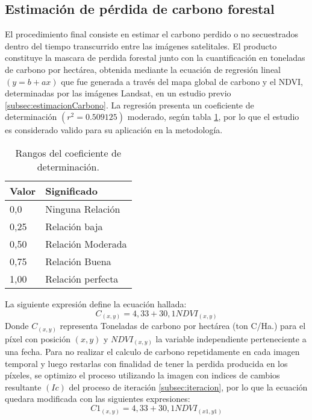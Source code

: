 \subsection{Estimaci\'on de p\'erdida de carbono forestal}
El procedimiento final consiste en estimar el carbono perdido o no secuestrados dentro del tiempo transcurrido entre las im\'agenes satelitales. El producto constituye la mascara de perdida forestal junto con la cuantificaci\'on en toneladas de carbono por hect\'area, obtenida mediante la ecuaci\'on de regresi\'on lineal $(y= b + ax) $ que fue generada a través del mapa global de carbono \cite{saatchi2011benchmark} y el NDVI, determinadas por las im\'agenes Landsat, en un estudio previo \ref{subsec:estimacionCarbono}. La regresi\'on presenta un coeficiente de determinaci\'on $ (r^{2}=0.509125) $ moderado, según tabla \ref{t:coefDeter}, por lo que el estudio es considerado valido para su aplicaci\'on en la metodolog\'ia.
\begin{table}[H]
	\centering
	\begin{tabular}{|l|l|}
		\hline
		\textbf{Valor} & \textbf{Significado} \\ \hline
		0,0            & Ninguna Relaci\'on     \\ \hline
		0,25           & Relaci\'on baja        \\ \hline
		0,50           & Relaci\'on Moderada    \\ \hline
		0,75           & Relaci\'on Buena       \\ \hline
		1,00           & Relaci\'on perfecta    \\ \hline
	\end{tabular}
	\caption{Rangos del coeficiente de determinaci\'on.}
	\label{t:coefDeter}
\end{table}
La siguiente expresi\'on define la ecuaci\'on hallada:
		\begin{equation}
			C_{(x,y)}=4,33+30,1 NDVI_{(x,y)}
		\end{equation}
Donde $ C_{(x,y)} $ representa Toneladas de carbono por hect\'area (ton C/Ha.) para el p\'ixel con posici\'on $ (x,y) $ y $ NDVI_{(x,y)} $ la variable independiente perteneciente a una fecha. Para no realizar el calculo de carbono repetidamente en cada imagen temporal y luego restarlas con finalidad de tener la perdida producida en los p\'ixeles, se optimizo el proceso  utilizando la imagen con indices de cambios resultante $ (Ic) $ del proceso de iteraci\'on \ref{subsec:iteracion}, por lo que la ecuaci\'on quedara modificada con las siguientes expresiones:
		\begin{equation}
				\label{e:fecha1}
		C1_{(x,y)}=4,33+30,1 NDVI_{(x1,y1)}
		\end{equation}
